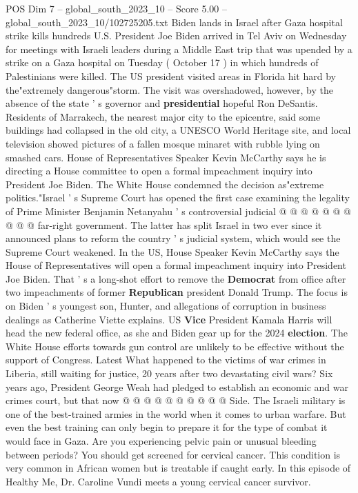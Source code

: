 \begin{textsample}{POS Dim 7 – global\_south\_2023\_10 – Score 5.00 – global\_south\_2023\_10/102725205.txt}  \label{ex:f7_pos_388}
Biden lands in Israel after Gaza hospital strike kills hundreds U.S.
President Joe Biden arrived in Tel Aviv on Wednesday for meetings with Israeli leaders during a Middle East trip that was upended by a strike on a Gaza hospital on Tuesday ( October 17 ) in which hundreds of Palestinians were killed.
The US president visited areas in Florida hit hard by the"extremely dangerous"storm.
The visit was overshadowed, however, by the absence of the state ' s governor and \textbf{presidential} hopeful Ron DeSantis.
Residents of Marrakech, the nearest major city to the epicentre, said some buildings had collapsed in the old city, a UNESCO World Heritage site, and local television showed pictures of a fallen mosque minaret with rubble lying on smashed cars.
House of Representatives Speaker Kevin McCarthy says he is directing a House committee to open a formal impeachment inquiry into President Joe Biden.
The White House condemned the decision as"extreme politics."Israel ' s Supreme Court has opened the first case examining the legality of Prime Minister Benjamin Netanyahu ' s controversial judicial @ @ @ @ @ @ @ @ @ @ far-right government.
The latter has split Israel in two ever since it announced plans to reform the country ' s judicial system, which would see the Supreme Court weakened.
In the US, House Speaker Kevin McCarthy says the House of Representatives will open a formal impeachment inquiry into President Joe Biden.
That ' s a long-shot effort to remove the \textbf{Democrat} from office after two impeachments of former \textbf{Republican} president Donald Trump.
The focus is on Biden ' s youngest son, Hunter, and allegations of corruption in business dealings as Catherine Viette explains.
US \textbf{Vice} President Kamala Harris will head the new federal office, as she and Biden gear up for the 2024 \textbf{election}.
The White House efforts towards gun control are unlikely to be effective without the support of Congress.
Latest What happened to the victims of war crimes in Liberia, still waiting for justice, 20 years after two devastating civil wars?
Six years ago, President George Weah had pledged to establish an economic and war crimes court, but that now @ @ @ @ @ @ @ @ @ @ Side.
The Israeli military is one of the best-trained armies in the world when it comes to urban warfare.
But even the best training can only begin to prepare it for the type of combat it would face in Gaza.
Are you experiencing pelvic pain or unusual bleeding between periods?
You should get screened for cervical cancer.
This condition is very common in African women but is treatable if caught early.
In this episode of Healthy Me, Dr.
Caroline Vundi meets a young cervical cancer survivor.

\end{textsample}
